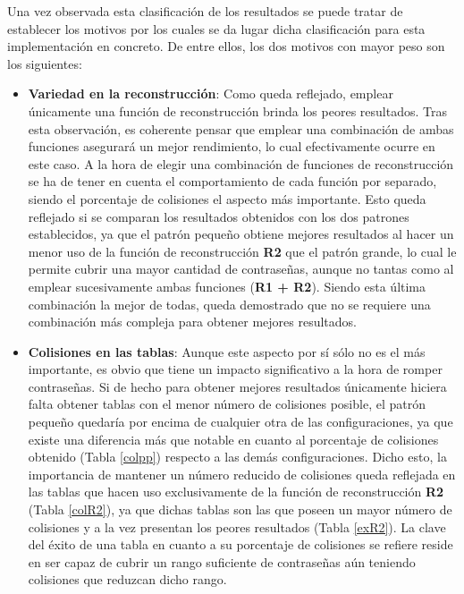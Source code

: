 \documentclass[12pt,spanish,listoffigures,listoftables]{tfgetsinf}
\begin{document}
Una vez observada esta clasificación de los resultados se puede tratar de establecer los motivos por los cuales se da lugar dicha clasificación para esta implementación en concreto. De entre ellos, los dos motivos con mayor peso son los siguientes:

\begin{itemize}

    \item \textbf{Variedad en la reconstrucción}: Como queda reflejado, emplear únicamente una función de reconstrucción brinda los peores resultados. Tras esta observación, es coherente pensar que emplear una combinación de ambas funciones asegurará un mejor rendimiento, lo cual efectivamente ocurre en este caso. A la hora de elegir una combinación de funciones de reconstrucción se ha de tener en cuenta el comportamiento de cada función por separado, siendo el porcentaje de colisiones el aspecto más importante. Esto queda reflejado si se comparan los resultados obtenidos con los dos patrones establecidos, ya que el patrón pequeño obtiene mejores resultados al hacer un menor uso de la función de reconstrucción \textbf{R2} que el patrón grande, lo cual le permite cubrir una mayor cantidad de contraseñas, aunque no tantas como al emplear sucesivamente ambas funciones (\textbf{R1 + R2}). Siendo esta última combinación la mejor de todas, queda demostrado que no se requiere una combinación más compleja para obtener mejores resultados.
    
    \item \textbf{Colisiones en las tablas}: Aunque este aspecto por sí sólo no es el más importante, es obvio que tiene un impacto significativo a la hora de romper contraseñas. Si de hecho para obtener mejores resultados únicamente hiciera falta obtener tablas con el menor número de colisiones posible, el patrón pequeño quedaría por encima de cualquier otra de las configuraciones, ya que existe una diferencia más que notable en cuanto al porcentaje de colisiones obtenido (Tabla \ref{colpp}) respecto a las demás configuraciones. Dicho esto, la importancia de mantener un número reducido de colisiones queda reflejada en las tablas que hacen uso exclusivamente de la función de reconstrucción \textbf{R2} (Tabla \ref{colR2}), ya que dichas tablas son las que poseen un mayor número de colisiones y a la vez presentan los peores resultados (Tabla \ref{exR2}). La clave del éxito de una tabla en cuanto a su porcentaje de colisiones se refiere reside en ser capaz de cubrir un rango suficiente de contraseñas aún teniendo colisiones que reduzcan dicho rango.
    
\end{itemize}
\end{document}
